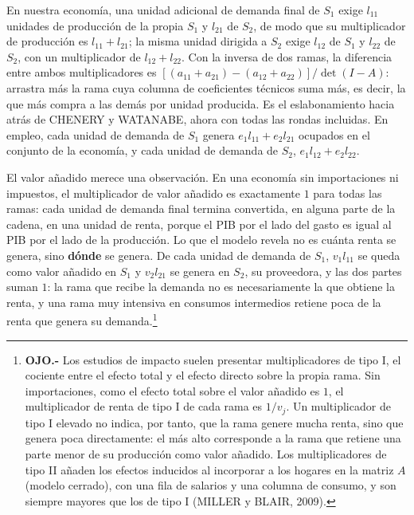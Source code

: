 \documentclass[10pt,a4paper]{article}
\begin{document}
En nuestra economía, una unidad adicional de demanda final de $S_1$ exige $l_{11}$ unidades de producción de la propia $S_1$ y $l_{21}$ de $S_2$, de modo que su multiplicador de producción es $l_{11}+l_{21}$; la misma unidad dirigida a $S_2$ exige $l_{12}$ de $S_1$ y $l_{22}$ de $S_2$, con un multiplicador de $l_{12}+l_{22}$. Con la inversa de dos ramas, la diferencia entre ambos multiplicadores es $\left[(a_{11}+a_{21})-(a_{12}+a_{22})\right]/\det(I-A)$: arrastra más la rama cuya columna de coeficientes técnicos suma más, es decir, la que más compra a las demás por unidad producida. Es el eslabonamiento hacia atrás de CHENERY y WATANABE, ahora con todas las rondas incluidas. En empleo, cada unidad de demanda de $S_1$ genera $e_1l_{11}+e_2l_{21}$ ocupados en el conjunto de la economía, y cada unidad de demanda de $S_2$, $e_1l_{12}+e_2l_{22}$.

El valor añadido merece una observación. En una economía sin importaciones ni impuestos, el multiplicador de valor añadido es exactamente $1$ para todas las ramas: cada unidad de demanda final termina convertida, en alguna parte de la cadena, en una unidad de renta, porque el PIB por el lado del gasto es igual al PIB por el lado de la producción. Lo que el modelo revela no es cuánta renta se genera, sino \textbf{dónde} se genera. De cada unidad de demanda de $S_1$, $v_1l_{11}$ se queda como valor añadido en $S_1$ y $v_2l_{21}$ se genera en $S_2$, su proveedora, y las dos partes suman $1$: la rama que recibe la demanda no es necesariamente la que obtiene la renta, y una rama muy intensiva en consumos intermedios retiene poca de la renta que genera su demanda.\footnote{%
    \textbf{OJO.-} Los estudios de impacto suelen presentar multiplicadores de tipo I, el cociente entre el efecto total y el efecto directo sobre la propia rama. Sin importaciones, como el efecto total sobre el valor añadido es $1$, el multiplicador de renta de tipo I de cada rama es $1/v_j$. Un multiplicador de tipo I elevado no indica, por tanto, que la rama genere mucha renta, sino que genera poca directamente: el más alto corresponde a la rama que retiene una parte menor de su producción como valor añadido. Los multiplicadores de tipo II añaden los efectos inducidos al incorporar a los hogares en la matriz $A$ (modelo cerrado), con una fila de salarios y una columna de consumo, y son siempre mayores que los de tipo I (MILLER y BLAIR, 2009).
}
\end{document}
